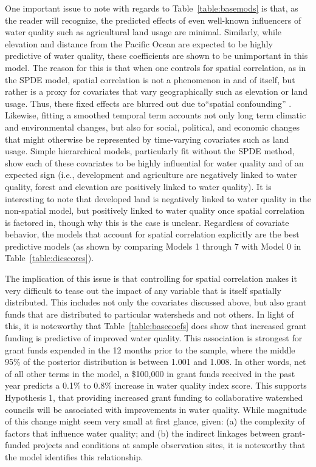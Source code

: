 \documentclass[12pt,a4paper,titlepage]{article}
\begin{document}


One important issue to note with regards to Table~\ref{table:basemods} is that, as the reader will recognize, the predicted effects of even well-known influencers of water quality such as agricultural land usage are minimal. Similarly, while elevation and distance from the Pacific Ocean are expected to be highly predictive of water quality, these coefficients are shown to be unimportant in this model. The reason for this is that when one controls for spatial correlation, as in the SPDE model, spatial correlation is not a phenomenon in and of itself, but rather is a proxy for covariates that vary geographically such as elevation or land usage. Thus, these fixed effects are blurred out due to``spatial confounding'' \parencite{hodges2014}. Likewise, fitting a smoothed temporal term accounts not only long term climatic and environmental changes, but also for social, political, and economic changes that might otherwise be represented by time-varying covariates such as land usage. Simple hierarchical models, particularly fit without the SPDE method, show each of these covariates to be highly influential for water quality and of an expected sign (i.e., development and agriculture are negatively linked to water quality, forest and elevation are positively linked to water quality). It is interesting to note that developed land is negatively linked to water quality in the non-spatial model, but positively linked to water quality once spatial correlation is factored in, though why this is the case is unclear. Regardless of covariate behavior, the models that account for spatial correlation explicitly are the best predictive models (as shown by comparing Models 1 through 7 with Model 0 in Table~\ref{table:dicscores}).

The implication of this issue is that controlling for spatial correlation makes it very difficult to tease out the impact of any variable that is itself spatially distributed. This includes not only the covariates discussed above, but also grant funds that are distributed to particular watersheds and not others. In light of this, it is noteworthy that Table~\ref{table:basecoefs} does show that increased grant funding is predictive of improved water quality. This association is strongest for grant funds expended in the 12 months prior to the sample, where the middle 95\% of the posterior distribution is between 1.001 and 1.008. In other words, net of all other terms in the model, a \$100,000 in grant funds received in the past year predicts a 0.1\% to 0.8\% increase in water quality index score. This supports Hypothesis 1, that providing increased grant funding to collaborative watershed councils will be associated with improvements in water quality. While magnitude of this change might seem very small at first glance, given: (a) the complexity of factors that influence water quality; and (b) the indirect linkages between grant-funded projects and conditions at sample observation sites, it is noteworthy that the model identifies this relationship.
\end{document}
